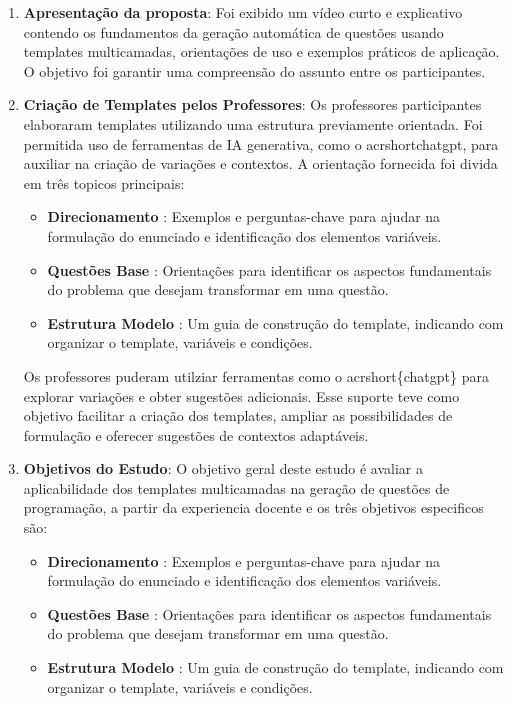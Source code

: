 \begin{enumerate}
    \item \textbf{Apresentação da proposta}:  Foi exibido um vídeo curto e explicativo contendo os fundamentos da geração automática de questões usando templates multicamadas, orientações de uso e exemplos práticos de aplicação. O objetivo foi garantir uma compreensão do assunto entre os participantes.
    
    \item \textbf{Criação de Templates pelos Professores}:  Os professores participantes elaboraram templates utilizando uma estrutura previamente orientada. Foi permitida uso de ferramentas de IA generativa, como o acrshort{chatgpt}, para auxiliar na criação de variações e contextos. A orientação fornecida foi divida em três topicos principais:
    \begin{itemize}
        \item \textbf{Direcionamento} : Exemplos e perguntas-chave para ajudar na formulação do enunciado e identificação dos elementos variáveis.
        \item \textbf{Questões Base} : Orientações para identificar os aspectos fundamentais do problema que desejam transformar em uma questão.
        \item \textbf{Estrutura Modelo} : Um guia de construção do template, indicando com organizar o template, variáveis e condições.
    \end{itemize}


Os professores puderam utilziar ferramentas como o  acrshort\{chatgpt\} para explorar variações e obter sugestões adicionais. Esse suporte teve como objetivo facilitar a criação dos templates, ampliar as possibilidades de formulação e oferecer sugestões de contextos adaptáveis.



    \item \textbf{Objetivos do Estudo}:  O objetivo geral deste estudo é avaliar a aplicabilidade dos templates multicamadas na geração de questões de programação, a partir da experiencia docente e os três objetivos especificos são:

       \begin{itemize}
        \item \textbf{Direcionamento} : Exemplos e perguntas-chave para ajudar na formulação do enunciado e identificação dos elementos variáveis.
        \item \textbf{Questões Base} : Orientações para identificar os aspectos fundamentais do problema que desejam transformar em uma questão.
        \item \textbf{Estrutura Modelo} : Um guia de construção do template, indicando com organizar o template, variáveis e condições.
    \end{itemize}
    

\end{enumerate}
